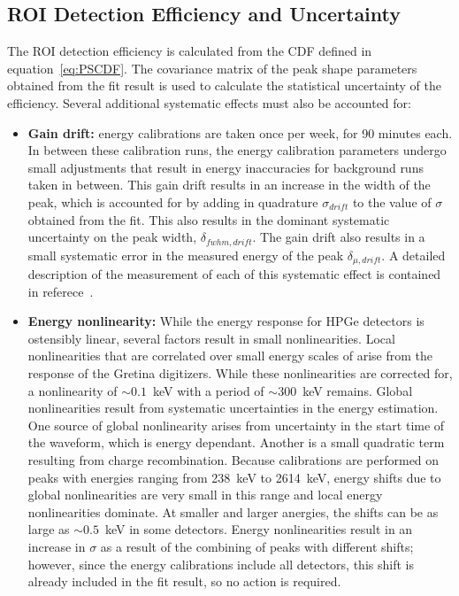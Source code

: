 \documentclass[/main.tex]{subfiles}
\begin{document}
\subsection{ROI Detection Efficiency and Uncertainty} \label{sec:ROIEff}
The ROI detection efficiency is calculated from the CDF defined in equation~\ref{eq:PSCDF}.
The covariance matrix of the peak shape parameters obtained from the fit result is used to calculate the statistical uncertainty of the efficiency.
Several additional systematic effects must also be accounted for:
\begin{itemize}
\item \textbf{Gain drift:}  energy calibrations are taken once per week, for 90 minutes each.
  In between these calibration runs, the energy calibration parameters undergo small adjustments that result in energy inaccuracies for background runs taken in between.
  This gain drift results in an increase in the width of the peak, which is accounted for by adding in quadrature $\sigma_{drift}$ to the value of $\sigma$ obtained from the fit.
  This also results in the dominant systematic uncertainty on the peak width, $\delta_{fwhm,drift}$.
  The gain drift also results in a small systematic error in the measured energy of the peak $\delta_{\mu,drift}$.
  A detailed description of the measurement of each of this systematic effect is contained in referece~\cite{energyunidoc}.  
\item \textbf{Energy nonlinearity:} While the energy response for HPGe detectors is ostensibly linear, several factors result in small nonlinearities.
  Local nonlinearities that are correlated over small energy scales of arise from the response of the Gretina digitizers.
  While these nonlinearities are corrected for, a nonlinearity of $\sim0.1$~keV with a period of $\sim300$~keV remains.
  Global nonlinearities result from systematic uncertainties in the energy estimation.
  One source of global nonlinearity arises from uncertainty in the start time of the waveform, which is energy dependant.
  Another is a small quadratic term resulting from charge recombination.
  Because calibrations are performed on peaks with energies ranging from 238~keV to 2614~keV, energy shifts due to global nonlinearities are very small in this range and local energy nonlinearities dominate.
  At smaller and larger anergies, the shifts can be as large as $\sim0.5$~keV in some detectors.
  Energy nonlinearities result in an increase in $\sigma$ as a result of the combining of peaks with different shifts; however, since the energy calibrations include all detectors, this shift is already included in the fit result, so no action is required.

\end{itemize}
\end{document}
